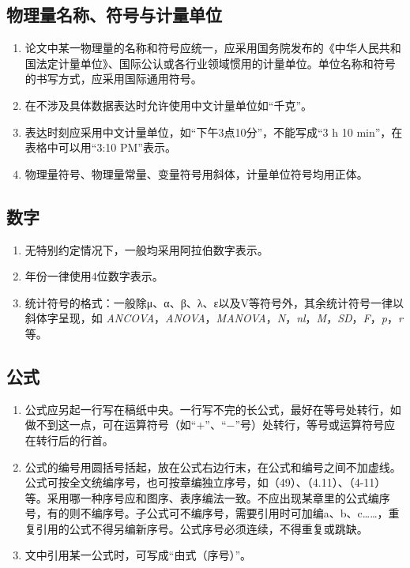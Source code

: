 \subsection{物理量名称、符号与计量单位}

\begin{enumerate}
    \item 论文中某一物理量的名称和符号应统一，应采用国务院发布的《中华人民共和国法定计量单位》、国际公认或各行业领域惯用的计量单位。单位名称和符号的书写方式，应采用国际通用符号。
    \item 在不涉及具体数据表达时允许使用中文计量单位如“千克”。
    \item 表达时刻应采用中文计量单位，如“下午3点10分”，不能写成“3 h 10 min”，在表格中可以用“3:10 PM”表示。
    \item 物理量符号、物理量常量、变量符号用斜体，计量单位符号均用正体。
\end{enumerate}

\subsection{数字}

\begin{enumerate}
    \item 无特别约定情况下，一般均采用阿拉伯数字表示。
    \item 年份一律使用4位数字表示。
    \item 统计符号的格式：一般除μ、α、β、λ、ε以及V等符号外，其余统计符号一律以斜体字呈现，如 \textit{ANCOVA}，\textit{ANOVA}，\textit{MANOVA}，\textit{N}，\textit{nl}，\textit{M}，\textit{SD}，\textit{F}，\textit{p}，\textit{r} 等。
\end{enumerate}

\subsection{公式}

\begin{enumerate}
    \item 公式应另起一行写在稿纸中央。一行写不完的长公式，最好在等号处转行，如做不到这一点，可在运算符号（如“$+$”、“$-$”号）处转行，等号或运算符号应在转行后的行首。
    \item 公式的编号用圆括号括起，放在公式右边行末，在公式和编号之间不加虚线。公式可按全文统编序号，也可按章编独立序号，如（49）、（4.11）、（4-11）等。采用哪一种序号应和图序、表序编法一致。不应出现某章里的公式编序号，有的则不编序号。子公式可不编序号，需要引用时可加编a、b、c……，重复引用的公式不得另编新序号。公式序号必须连续，不得重复或跳缺。
    \item 文中引用某一公式时，可写成“由式（序号）”。
\end{enumerate}

